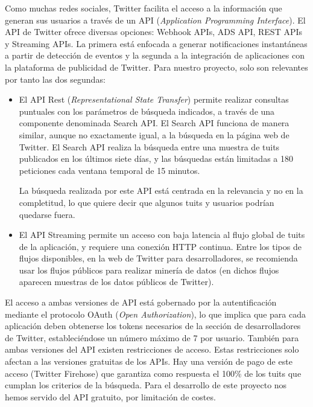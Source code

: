 Como muchas redes sociales, Twitter facilita el acceso a la información que generan sus 
usuarios a través de un
API ({\em Application Programming Interface})\cite{twitter_dev_web}. El API de Twitter ofrece diversas opciones: 
Webhook APIs, ADS API, REST APIs y Streaming APIs. La primera está enfocada a generar  
notificaciones instantáneas a partir de detección de eventos y la segunda a la integración de aplicaciones con la 
plataforma de publicidad de Twitter. Para nuestro proyecto, solo son relevantes por tanto las dos segundas:
\begin{itemize}
\item El API Rest ({\em Representational State Transfer}) permite realizar consultas puntuales con los parámetros de búsqueda indicados,
a través de una componente denominada Search API. El Search API funciona de manera similar, aunque no 
exactamente igual, a la búsqueda en la página web de Twitter. El Search API 
realiza la búsqueda entre una muestra de tuits publicados en los últimos siete días, y
las búsquedas están limitadas a 180 peticiones cada ventana temporal de 15 minutos. 


La búsqueda realizada por este API está centrada en la relevancia y no en la completitud, lo que 
quiere decir que algunos tuits y usuarios podrían quedarse fuera.

\item El API Streaming permite un acceso con baja latencia al flujo global de tuits de la aplicación,
y requiere una conexión HTTP continua. Entre los tipos de flujos disponibles, en la web de Twitter
para desarrolladores, se recomienda usar los flujos públicos para realizar minería de datos (en dichos flujos
aparecen muestras de los datos públicos de Twitter).


\end{itemize}

El acceso a ambas versiones de API está gobernado por la autentificación mediante el protocolo OAuth
({\em Open Authorization}), lo que implica que para cada aplicación deben obtenerse los tokens necesarios 
de la sección de desarrolladores de Twitter, estableciéndose un número máximo de 7 por usuario.
También para ambas versiones del API existen restricciones de acceso. Estas restricciones solo
afectan a las versiones gratuitas de los APIs. Hay una versión de pago de este acceso  (Twitter Firehose)
que garantiza como respuesta el 100\% de los tuits que cumplan los criterios de la búsqueda.
Para el desarrollo de este proyecto nos hemos servido del API gratuito, por limitación de costes. 

